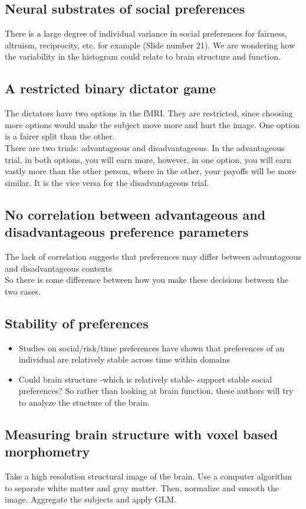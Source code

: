 \subsection{Neural substrates of social preferences}
There is a large degree of individual variance in social preferences for fairness, altruism, reciprocity, etc. for example (Slide number 21). We are wondering how the variability in the histogram could relate to brain  structure and function.
\subsection{A restricted binary dictator game}
The dictators have two options in the fMRI. They are restricted, since choosing more options would make the subject move more and hurt the image. One option is a fairer split than the other.
\\There are two trials: advantageous and disadvantageous. In the advantageous trial, in both options, you will earn more, however, in one option, you will earn vastly more than the other person, where in the other, your payoffs will be more similar. It is the vice versa for the disadvantageous trial.

\subsection{No correlation between advantageous and disadvantageous preference parameters}
The lack of correlation suggests that preferences may differ between advantageous and disadvantageous contexts
\\So there is some difference between how you make these decisions between the two cases.

\subsection{Stability of preferences}
\begin{itemize}
    \item Studies on social/risk/time preferences have shown that preferences of an individual are relatively stable across time within domains
\item Could brain structure -which is relatively stable- support stable social preferences? So rather than looking at brain function, these authors will try to analyze the stucture of the brain.
\end{itemize}

\subsection{Measuring brain structure with voxel based morphometry}
Take a high resolution structural image of the brain. Use a computer algorithm to separate white matter and gray matter. Then, normalize and smooth the image. Aggregate the subjects and apply GLM.

